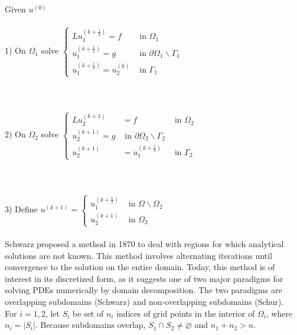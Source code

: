 \documentclass[11pt]{book}
\begin{document}
Given $u^{(0)}$\\ \\ 
1) On $\Omega_1$ solve $\begin{cases}L u_1^{\left(k+\frac{1}{2}\right)}=f & \text { in } \Omega_1 \\ u_1^{\left(k+\frac{1}{2}\right)}=g & \text { in } \partial \Omega_1 \backslash \Gamma_1 \\ u_1^{\left(k+\frac{1}{2}\right)}=u_2^{(k)} & \text { in } \Gamma_1\end{cases}$ \\ \\ \\ \\
2) On $\Omega_2$ solve $\left\{\begin{array}{rlrl}L u_2^{(k+1)} & =f &  \text { in } \Omega_2 \\ u_2^{(k+1)}=g &  \text { in } \partial \Omega_2 \backslash \Gamma_2 \\
u_2^{(k+1)} & =u_1^{\left(k+\frac{1}{2}\right)} &  \text { in } \Gamma_2\end{array}\right.$ \\ \\ \\ \\
3) Define $u^{(k+1)}=\left\{\begin{array}{lr}u_1^{\left(k+\frac{1}{2}\right)} & \text { in } \Omega  \backslash \Omega_2 \\ 
u_2^{(k+1)} & \text { in } \Omega_2\end{array}\right.$\\ \\
Schwarz proposed a method in 1870 to deal with regions for which analytical solutions are not known. This method involves alternating iterations until convergence to the solution on the entire domain. Today, this method is of interest in its discretized form, as it suggests one of two major paradigms for solving PDEs numerically by domain decomposition. The two paradigms are overlapping subdomains (Schwarz) and non-overlapping subdomains (Schur).\\
For $i=1,2$, let $S_{i}$ be set of $n_{i}$ indices of grid points in the interior of $\Omega_{i}$, where $n_{i}=\left|S_{i}\right|$. Because subdomains overlap, $S_{1} \cap S_{2} \neq \varnothing$ and $n_{1}+n_{2}>n$.
\end{document}
